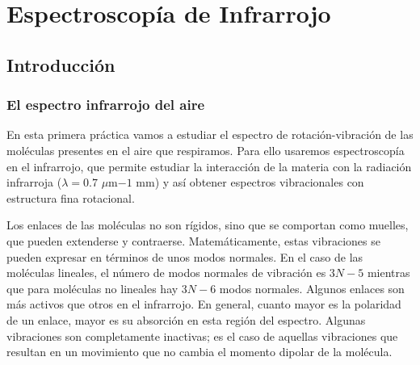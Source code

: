 \documentclass{tufte-book}
\begin{document}




\chapter[Infrarrojo]{Espectroscopía de Infrarrojo}
\section{Introducción}
\subsection{El espectro infrarrojo del aire}
En esta primera práctica vamos a estudiar el espectro de rotación-vibración
de las moléculas presentes en el aire que respiramos. Para ello usaremos
espectroscopía en el infrarrojo, que permite estudiar la interacción de la
materia con la radiación infrarroja ($\lambda=0.7$ $\mu$m$-1$ mm) y así 
obtener espectros vibracionales con estructura fina rotacional. 

Los enlaces de las moléculas no son rígidos, sino que se comportan como 
muelles, que pueden extenderse y contraerse. Matemáticamente, estas 
vibraciones se pueden expresar en términos de unos modos normales. En el 
caso de las moléculas lineales, el número de modos normales de vibración 
es $3N-5$ mientras que para moléculas no lineales hay $3N-6$ modos normales.
Algunos enlaces son más activos que otros en el infrarrojo. En general, 
cuanto mayor es la polaridad de un enlace, mayor es su absorción en esta
región del espectro. Algunas vibraciones son completamente inactivas; 
es el caso de aquellas vibraciones que resultan en un movimiento que no
cambia el momento dipolar de la molécula. 
\end{document}
